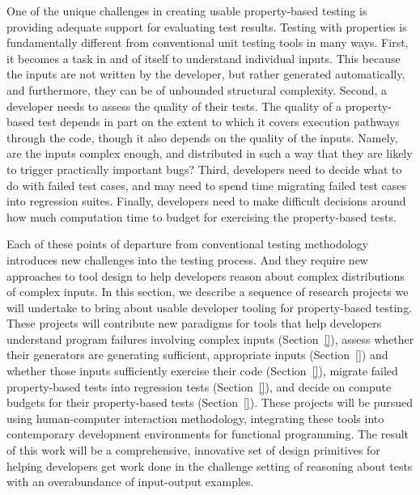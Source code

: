 \label{sec:val}

One of the unique challenges in creating usable property-based testing is
providing adequate support for evaluating test results. Testing with properties
is fundamentally different from conventional unit testing tools in many ways.
First, it becomes a task in and of itself to understand individual inputs. This
because the inputs are not written by the developer, but rather generated
automatically, and furthermore, they can be of unbounded structural complexity.
Second, a developer needs to assess the quality of their tests. The quality of a
property-based test depends in part on the extent to which it covers execution
pathways through the code, though it also depends on the quality of the inputs.
Namely, are the inputs complex enough, and distributed in such a way that they
are likely to trigger practically important bugs? Third, developers need to
decide what to do with failed test cases, and may need to spend time migrating
failed test cases into regression suites. Finally, developers need to make
difficult decisions around how much computation time to budget for exercising
the property-based tests.

Each of these points of departure from conventional testing methodology
introduces new challenges into the testing process. And they require new
approaches to tool design to help developers reason about complex distributions
of complex inputs. In this section, we describe a sequence of research projects
we will undertake to bring about usable developer tooling for property-based
testing. These projects will contribute new paradigms for tools that help
developers understand program failures involving complex inputs
(Section~\ref{}), assess whether their generators are generating sufficient,
appropriate inputs (Section~\ref{}) and whether those inputs sufficiently
exercise their code (Section~\ref{}), migrate failed property-based tests into
regression tests (Section~\ref{}), and decide on compute budgets for their
property-based tests (Section~\ref{}). These projects will be pursued using
human-computer interaction methodology, integrating these tools into
contemporary development environments for functional programming. The result of
this work will be a comprehensive, innovative set of design primitives for
helping developers get work done in the challenge setting of reasoning about
tests with an overabundance of input-output examples.


